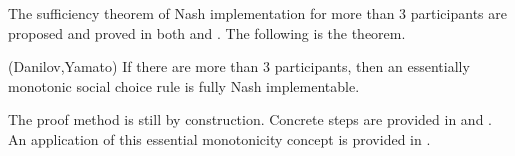 The sufficiency theorem of Nash implementation for more than 3
participants are proposed and proved in both \parencite{Danilov1992}
and \parencite{Yamato1992}. The following is the theorem.

\begin{thm*}(Danilov,Yamato)
If there are more than 3 participants, then an essentially monotonic
social choice rule  is fully Nash implementable.
\end{thm*}
The proof method is still by construction. Concrete steps are provided in \parencite{Danilov1992}
and \parencite{Yamato1992}.  An application of this essential monotonicity concept is provided
in \parencite{SonmezJet1996}.

